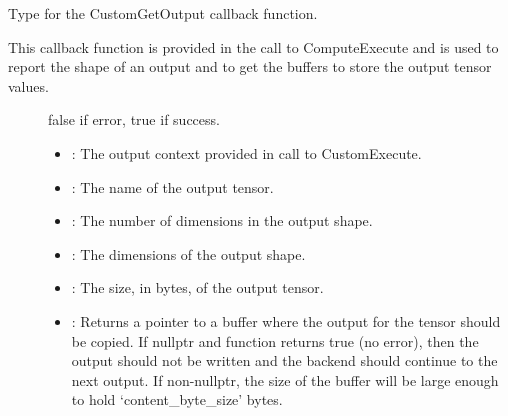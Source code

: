 \documentclass[letterpaper,10pt,english]{sphinxmanual}
\begin{document}
\begin{fulllineitems}
\label{\detokenize{cpp_api/typedef_custom_8h_1a71cb419d6e7feee902115438973d02f8:_CPPv419CustomGetOutputFn_t}}%
\pysigstartmultiline
{}%
\pysigstopmultiline
Type for the CustomGetOutput callback function. 

This callback function is provided in the call to ComputeExecute and is used to report the shape of an output and to get the buffers to store the output tensor values.

\begin{description}
\item[{}] \leavevmode
false if error, true if success. 

\item[{}] \leavevmode\begin{itemize}
\item {} 
: The output context provided in call to CustomExecute. 

\item {} 
: The name of the output tensor. 

\item {} 
: The number of dimensions in the output shape. 

\item {} 
: The dimensions of the output shape. 

\item {} 
: The size, in bytes, of the output tensor. 

\item {} 
: Returns a pointer to a buffer where the output for the tensor should be copied. If nullptr and function returns true (no error), then the output should not be written and the backend should continue to the next output. If non-nullptr, the size of the buffer will be large enough to hold ‘content\_byte\_size’ bytes. 

\end{itemize}

\end{description}


\end{fulllineitems}
\end{document}
